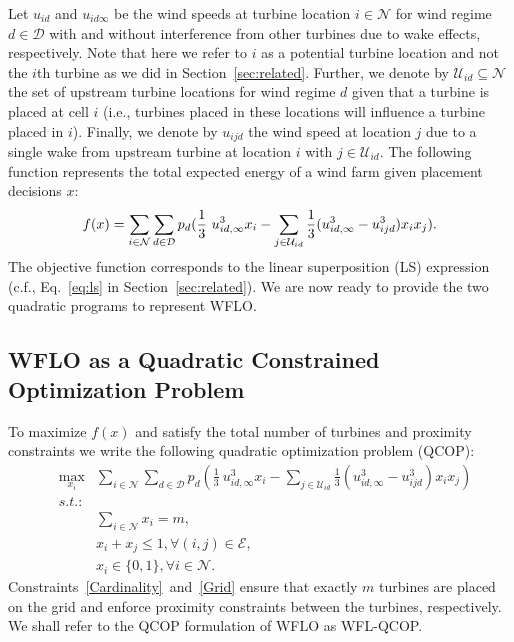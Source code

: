 \documentclass[preprint,12pt]{elsarticle}
\begin{document}
Let $u_{id}$ and $u_{id\infty}$ 
be the wind speeds at turbine location $i \in \mathcal{N}$ for wind regime $d \in \mathcal{D}$
with and without interference from other turbines due to wake effects, respectively. 
Note that here we refer to $i$ as a potential turbine location and not the $i$th turbine as we did in Section~\ref{sec:related}.
Further, we denote by $\mathcal{U}_{id} \subseteq \mathcal{N}$ 
the set of upstream 
turbine locations for wind regime $d$
given that a turbine is placed at cell $i$ (i.e., turbines placed in these locations 
will influence a turbine placed in $i$). Finally,
we denote by $u_{ijd}$ the wind speed at location $j$ due to a single wake from upstream turbine at location $i$ with $j \in \mathcal{U}_{id}$. 
The following function  
represents the total expected energy of a wind farm given placement decisions 
$x$: \begin{equation}
f(x) = \sum_{i \in \mathcal{N}}^{} \sum_{d \in \mathcal{D}}^{} p_d ( \frac{1}{3} \ u_{id, \infty}^3 x_i  - \sum_{j \in \mathcal{U}_{id}}^{} \frac{1}{3}(u_{id, \infty} ^3 - u_{ijd}^3)x_i x_j).   \label{ObjFunc}\\
\end{equation} The objective function corresponds to the linear superposition (LS)
expression (c.f., Eq.~\ref{eq:ls} in Section~\ref{sec:related}). We are now ready to provide the two quadratic programs to represent WFLO.

\subsection{WFLO as a Quadratic Constrained Optimization Problem}

To 
maximize $f(x)$ and satisfy the total number of turbines and proximity 
constraints we write
the following quadratic optimization problem (QCOP):
\begin{eqnarray} \label{QCOP}
&\max_{x_i}^{}& \sum_{i \in \mathcal{N}}^{} \sum_{d \in \mathcal{D}}^{} p_d ( \frac{1}{3} \ u_{id, \infty}^3 x_i  - \sum_{j \in \mathcal{U}_{id}}^{} \frac{1}{3}(u_{id, \infty} ^3 - u_{ijd}^3)x_i x_j)   \\
&s.t.:& \nonumber\\
&\mbox{       }& \sum_{i \in \mathcal{N}}^{} x_i = m,\label{Cardinality}\\
&\mbox{       }& x_i + x_j \leq 1,   \forall (i,j) \in \mathcal{E}, \label{Grid}\\
&\mbox{       }& x_i \in \{0,1\},     \forall i \in \mathcal{N}. \label{Vars}
\end{eqnarray} Constraints~\ref{Cardinality}~and~\ref{Grid} ensure that exactly $m$ turbines are placed on the grid
and enforce proximity constraints between the turbines, respectively. We shall refer to the QCOP
formulation of WFLO as WFL-QCOP. 
\end{document}
